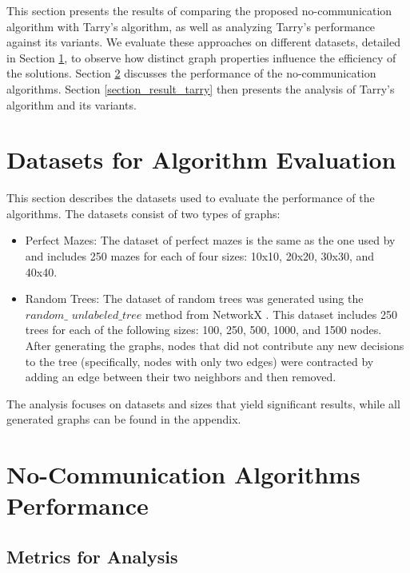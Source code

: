 This section presents the results of comparing the proposed no-communication algorithm with Tarry's algorithm, as well as analyzing Tarry's performance against its variants. We evaluate these approaches on different datasets, detailed in Section \ref{section_datasets}, to observe how distinct graph properties influence the efficiency of the solutions. Section \ref{section_result_no_comm} discusses the performance of the no-communication algorithms. Section \ref{section_result_tarry} then presents the analysis of Tarry's algorithm and its variants.

\section{Datasets for Algorithm Evaluation} 
\label{section_datasets}

This section describes the datasets used to evaluate the performance of the algorithms. The datasets consist of two types of graphs:

\begin{itemize} 
    \item Perfect Mazes: The dataset of perfect mazes \cite{Naeem2021} is the same as the one used by  and includes 250 mazes for each of four sizes: 10x10, 20x20, 30x30, and 40x40.
    \item Random Trees: The dataset of random trees was generated using the $random\_$ $unlabeled\_tree$ method from NetworkX \cite{Hagberg2008}. This dataset includes 250 trees for each of the following sizes: 100, 250, 500, 1000, and 1500 nodes. After generating the graphs, nodes that did not contribute any new decisions to the tree (specifically, nodes with only two edges) were contracted by adding an edge between their two neighbors and then removed. 
\end{itemize}

The analysis focuses on datasets and sizes that yield significant results, while all generated graphs can be found in the appendix.


\section{No-Communication Algorithms Performance}
\label{section_result_no_comm}

\subsection{Metrics for Analysis}
\label{subsection_no_comm_metrics}

